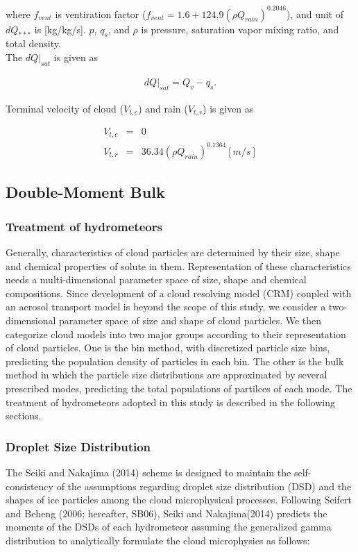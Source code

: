 where $f_{vent}$ is ventiration factor ($f_{vent}=1.6+124.9(\rho Q_{rain})^{0.2046}$), and unit of $dQ_{***}$ is [kg/kg/s]. $p$, $q_{s}$, and $\rho$ is pressure, saturation vapor mixing ratio, and total density.\\
The $dQ|_{sat}$ is given as

\begin{eqnarray}
dQ|_{sat}=Q_{v}-q_{s}.
\end{eqnarray}

Terminal velocity of cloud ($V_{t,c}$) and rain ($V_{t,r}$) is given as

\begin{eqnarray}
V_{t,c}&=&0\\
V_{t,r}&=&36.34(\rho Q_{rain})^{0.1364} [m/s]
\end{eqnarray}



\subsection{Double-Moment Bulk\cite{sn_2014}}

\subsubsection{Treatment of hydrometeors}
Generally, characteristics of cloud particles are determined by their size, shape and chemical properties of solute in them. Representation of these characteristics needs a multi-dimensional parameter space of size, shape and chemical compositions. Since development of a cloud resolving model (CRM) coupled with an aerosol transport model is beyond the scope of this study, we consider a two-dimensional parameter space of size and shape of cloud particles. We then categorize cloud models into two major groups according to their representation of cloud particles. One is the bin method, with discretized particle size bins, predicting the population density of particles in each bin. The other is the bulk method in which the particle size distributions are approximated by several prescribed modes, predicting the total populations of partilces of each mode. The treatment of hydrometeors adopted in this study is described in the following sections.

\subsubsection{Droplet Size Distribution}
The Seiki and Nakajima (2014)\cite{sn_2014} scheme is designed to maintain the self-consistency of the assumptions regarding droplet size distribution (DSD) and the shapes of ice particles among the cloud microphysical processes. Following Seifert and Beheng (2006; hereafter, SB06), Seiki and Nakajima(2014)\cite{sn_2014} predicts the moments of the DSDs of each hydrometeor assuming the generalized gamma distribution to analytically formulate the cloud microphysics as follows:

